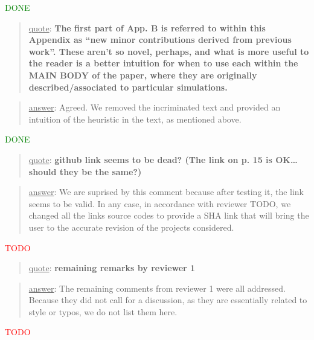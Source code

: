 \documentclass[a4paper]{article}
\newcommand{\done}[0]{\textcolor{green}{DONE}}
\newcommand{\ndone}[0]{\textcolor{red}{TODO}}
\newcommand\quot[1]{\begin{quote} \underline{quote}: \textbf{#1}\end{quote}}
\newcommand\as[1]{\begin{quote} \underline{answer}: {#1}\end{quote} }
\begin{document}
\done

\quot{
The first part of App. B is referred to within this Appendix as “new minor contributions derived from previous work”. These aren’t so novel, perhaps, and what is more useful to the reader is a better intuition for when to use each within the MAIN BODY of the paper, where they are originally described/associated to particular simulations.
}

\as{Agreed. We removed the incriminated text and provided an intuition of the heuristic in the text, as mentioned above.}\done

\quot{github link seems to be dead? (The link on p. 15 is OK… should they be the same?)}

\as{We are suprised by this comment because after testing it, the link seems to be valid. In any case, in accordance with reviewer TODO, we changed all the links source codes to provide a SHA link that will bring the user to the accurate revision of the projects considered.}\ndone

\quot{remaining remarks by reviewer 1}
\as{The remaining comments from reviewer 1 were all addressed. Because they did not call for a discussion, as they are essentially related to style or typos, we do not list them here.}\ndone
\end{document}
